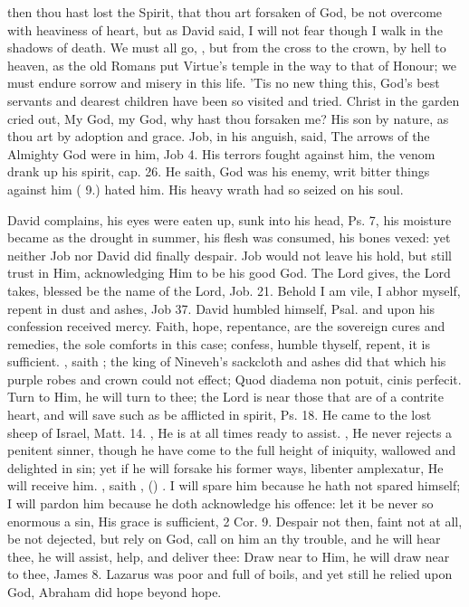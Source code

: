 {then thou hast lost the Spirit, that thou art forsaken of God, be not
overcome with heaviness of heart, but as David said, I will not fear
though I walk in the shadows of death. We must all go, , but from the cross to the crown, by hell to heaven,
as the old Romans put Virtue's temple in the way to that of Honour; we
must endure sorrow and misery in this life. 'Tis no new thing this,
God's best servants and dearest children have been so visited and
tried. Christ in the garden cried out, My God, my God, why hast thou
forsaken me? His son by nature, as thou art by adoption and grace. Job,
in his anguish, said, The arrows of the Almighty God were in him, Job
 4. His terrors fought against him, the venom drank up his spirit,
cap.  26. He saith, God was his enemy, writ bitter things against
him ( 9.) hated him. His heavy wrath had so seized on his soul.

David complains, his eyes were eaten up, sunk into his head, Ps.  7,
his moisture became as the drought in summer, his flesh was consumed,
his bones vexed: yet neither Job nor David did finally despair. Job
would not leave his hold, but still trust in Him, acknowledging Him to
be his good God. The Lord gives, the Lord takes, blessed be the name of
the Lord, Job.  21. Behold I am vile, I abhor myself, repent in dust
and ashes, Job  37. David humbled himself, Psal.  and upon
his confession received mercy. Faith, hope, repentance, are the
sovereign cures and remedies, the sole comforts in this case; confess,
humble thyself, repent, it is sufficient. , saith \Chrysostom{}; the king of Nineveh's sackcloth and
ashes did that which his purple robes and crown could not effect; Quod
diadema non potuit, cinis perfecit. Turn to Him, he will turn to thee;
the Lord is near those that are of a contrite heart, and will save such
as be afflicted in spirit, Ps.  18. He came to the lost sheep of
Israel, Matt.  14. ,
He is at all times ready to assist. , He never rejects a penitent
sinner, though he have come to the full height of iniquity, wallowed
and delighted in sin; yet if he will forsake his former ways, libenter
amplexatur, He will receive him. , saith
\Austin{}, () . I will spare him because he hath not spared
himself; I will pardon him because he doth acknowledge his offence: let
it be never so enormous a sin, His grace is sufficient, 2 Cor.  9.
Despair not then, faint not at all, be not dejected, but rely on God,
call on him an thy trouble, and he will hear thee, he will assist,
help, and deliver thee: Draw near to Him, he will draw near to thee,
James  8. Lazarus was poor and full of boils, and yet still he
relied upon God, Abraham did hope beyond hope.

}
